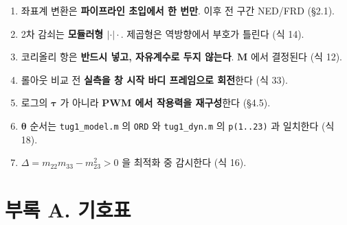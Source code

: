 \documentclass[10pt,a4paper]{article}
\begin{document}
\begin{enumerate}[leftmargin=1.5em,itemsep=2pt,parsep=2pt,topsep=3pt]
\item 좌표계 변환은 \textbf{파이프라인 초입에서 한 번만}. 이후 전 구간 NED/FRD (\S{}2.1).
\item 2차 감쇠는 \textbf{모듈러형 $|\cdot|\cdot$}. 제곱형은 역방향에서 부호가 틀린다 (식 14).
\item 코리올리 항은 \textbf{반드시 넣고, 자유계수로 두지 않는다}. $\mathbf{M}$ 에서 결정된다 (식 12).
\item 롤아웃 비교 전 \textbf{실측을 창 시작 바디 프레임으로 회전}한다 (식 33).
\item 로그의 $\boldsymbol{\tau}$ 가 아니라 \textbf{PWM 에서 작용력을 재구성}한다 (\S{}4.5).
\item $\boldsymbol{\theta}$ 순서는 \texttt{tug1\_model.m} 의 \texttt{ORD} 와 \texttt{tug1\_dyn.m} 의 \texttt{p(1..23)} 과 일치한다 (식 18).
\item $\Delta = m_{22}m_{33} - m_{23}^2 > 0$ 을 최적화 중 감시한다 (식 16).
\end{enumerate}

\section*{부록 A. 기호표}
\end{document}
